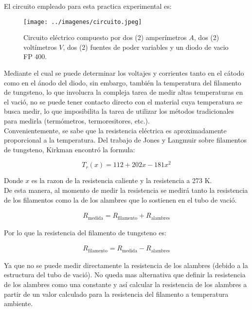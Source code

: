 \documentclass[%
 reprint,
 amsmath,amssymb,
 aps,
]{revtex4-2}
\begin{document}
El circuito empleado para esta practica experimental es:
\\

\begin{figure}[H]
    \centering
    \texttt{[image: ../imagenes/circuito.jpeg]}
    \caption{Circuito eléctrico compuesto por dos (2) amperímetros $A$, dos (2) voltímetros $V$, dos (2) fuentes de poder variables y un diodo de vacio FP 400.}
    \label{fig:6}
\end{figure}

Mediante el cual se puede determinar los voltajes y corrientes tanto en el cátodo como en el ánodo del diodo, sin embargo, también la temperatura del filamento de tungsteno, lo que involucra la compleja tarea de medir altas temperaturas en el vació, no se puede tener contacto directo con el material cuya temperatura se busca medir, lo que imposibilita la tarea de utilizar los métodos tradicionales para medirla (termómetros, termoresitores, etc.).
\\

Convenientemente, se sabe que la resistencia eléctrica es aproximadamente proporcional a la temperatura. Del trabajo de Jones y Langmuir \cite{jones} sobre filamentos de tungsteno, Kirkman encontró la formula:

\begin{equation}
    T_{r}(x) = 112 +202x -181x^2
    \label{eq: Kirkman}
\end{equation}
    
\vspace{0.2 cm}
Donde $x$ es la razon de la resistencia caliente y la resistencia a 273 K.
\\

De esta manera, al momento de medir la resistencia se medirá tanto la resistencia de los filamentos como la de los alambres que lo sostienen en el tubo de vació.

\begin{align*}
    R_{\text{medida}} = R_{\text{filamento}} + R_{\text{alambres}}
\end{align*}

Por lo que la resistencia del filamento de tungsteno es:

\begin{align*}
    R_{\text{filamento}} = R_{\text{medida}} - R_{\text{alambres}}
\end{align*}

\vspace{0.2 cm}
Ya que no se puede medir directamente la resistencia de los alambres (debido a la estructura del tubo de vació). No queda mas alternativa que definir la resistencia de los alambres como una constante  y así calcular la resistencia de los alambres a partir de un valor calculado para la resistencia del filamento a temperatura ambiente.
\\
\end{document}
